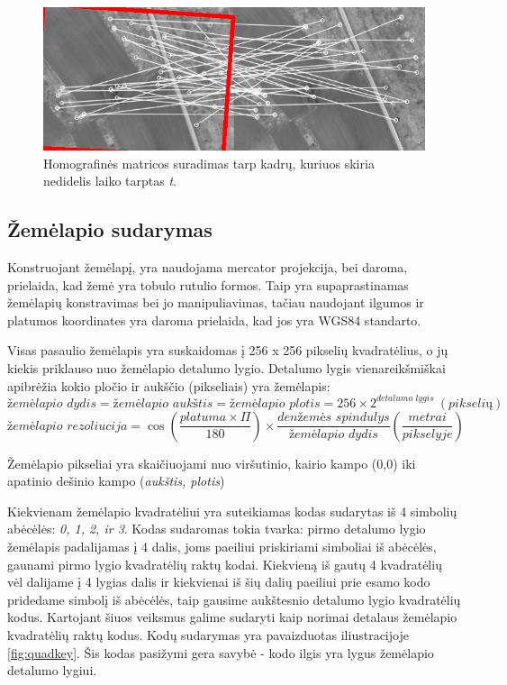 \documentclass[a4paper,12pt]{article}
\begin{document}
		\begin{figure}[h]
			\includegraphics[width=\textwidth]{images/HomographyMatrix.png}
			\caption{Homografinės matricos suradimas tarp kadrų, kuriuos skiria nedidelis laiko tarptas \textit{t}.}
			\label{fig:Homography}
		\end{figure}				
		
			\subsection{Žemėlapio sudarymas}
			\label{sec:CreationOfMap}
			
			Konstruojant žemėlapį, yra naudojama \gls{mercator} projekcija, bei daroma, prielaida, kad žemė yra tobulo rutulio formos. Taip yra supaprastinamas žemėlapių konstravimas bei jo manipuliavimas, tačiau naudojant ilgumos ir platumos koordinates yra daroma prielaida, kad jos yra \gls{WGS84} standarto.
			
			Visas pasaulio žemėlapis yra suskaidomas į 256 x 256 pikselių kvadratėlius, o jų kiekis priklauso nuo žemėlapio detalumo lygio.
			Detalumo lygis vienareikšmiškai apibrėžia kokio pločio ir aukščio (pikseliais) yra žemėlapis:	
			\begin{equation}
			\textit{žemėlapio dydis} = \textit{žemėlapio aukštis} = \textit{žemėlapio plotis} = 256 \times 2^\textit{detalumo lygis } \left(\textit{pikselių}\right)
			\end{equation}
			\begin{equation}
			\textit{žemėlapio rezoliucija} = \cos({\frac{platuma \times \Pi}{180}}) \times \frac{{den} \textit{žemės spindulys}}{\textit{žemėlapio dydis}} \left(\frac{metrai}{pikselyje}\right) 
			\label{eq:MapResolution}
			\end{equation}		
			
			Žemėlapio pikseliai yra skaičiuojami nuo viršutinio, kairio kampo (0,0) iki apatinio dešinio kampo (\textit{aukštis, plotis})		
			
			Kiekvienam žemėlapio kvadratėliui yra suteikiamas kodas sudarytas iš 4 simbolių abėcėlės: \textit{0, 1, 2, ir 3}. Kodas sudaromas tokia tvarka: pirmo detalumo lygio žemėlapis padalijamas į 4 dalis, joms paeiliui priskiriami simboliai iš abėcėlės, gaunami pirmo lygio kvadratėlių raktų kodai. Kiekvieną iš gautų 4 kvadratėlių vėl dalijame į 4 lygias dalis ir kiekvienai iš šių dalių paeiliui prie esamo kodo pridedame simbolį iš abėcėlės, taip gausime aukštesnio detalumo lygio kvadratėlių kodus. Kartojant šiuos veiksmus galime sudaryti kaip norimai detalaus žemėlapio kvadratėlių raktų kodus. Kodų sudarymas yra pavaizduotas iliustracijoje \ref{fig:quadkey}. Šis kodas pasižymi gera savybė - kodo ilgis yra lygus žemėlapio detalumo lygiui.
			
\end{document}
